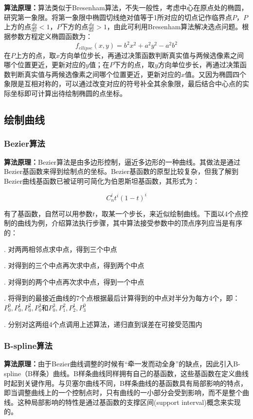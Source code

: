\documentclass[a4paper,UTF8]{article}
\theoremstyle{definition}
\begin{document}
\textbf{算法原理：}算法类似于Bresenham算法，不失一般性，考虑中心在原点处的椭圆，研究第一象限。将第一象限中椭圆切线绝对值等于1所对应的切点记作临界点$P$，$P$上方的点$\frac{dy}{dx}<1$，$P$下方的点$\frac{dy}{dx}>1$，由此可利用Bresenham算法解决选点问题。根据参数方程定义椭圆函数为：
$$f_{ellipse}(x,y)=b^2x^2+a^2y^2-a^2b^2$$
在$P$上方的点，取$x$方向单位步长，再通过决策函数判断真实值与两候选像素之间哪个位置更近，更新对应的$y$值；在$P$下方的点，取$y$方向单位步长，再通过决策函数判断真实值与两候选像素之间哪个位置更近，更新对应的$x$值。又因为椭圆四个象限是互相对称的，可以通过改变对应的符号补全其余象限，最后结合中心点的实际坐标即可计算出待绘制椭圆的点坐标。

\subsection{绘制曲线}

\subsubsection{Bezier算法}

\textbf{算法原理：}Bezier算法是由多边形控制，逼近多边形的一种曲线。其做法是通过Bezier基函数来得到绘制点的坐标。Bezier基函数的原型比较复杂，但我了解到Bezier曲线基函数已被证明可简化为伯恩斯坦基函数，其形式为：

$$C_n^it^i(1-t)^i$$

有了基函数，自然可以用参数$t$，取某一个步长，来近似绘制曲线。下面以4个点控制的曲线为例，介绍算法执行步骤，其中算法接受参数中的顶点序列应当是有序的：

. 对两两相邻点求中点，得到三个中点

. 对得到的三个中点再次求中点，得到两个中点

. 对得到的两个中点再次求中点，得到一个中点

. 将得到的最接近曲线的7个点根据最后计算得到的中点对半分为每方4个，即：$P_0^0,P_0^1,P_0^2,P_0^3$和$P_0^3,P_1^2,P_2^1,P_3^0$ 

. 分别对这两组4个点调用上述算法，递归直到误差在可接受范围内

\subsubsection{B-spline算法}

\textbf{算法原理：}由于Bezier曲线调整的时候有“牵一发而动全身”的缺点，因此引入B-spline（B样条）曲线。B样条曲线同样拥有自己的基函数，这些基函数在定义曲线时起到关键作用。与贝塞尔曲线不同，B样条曲线的基函数具有局部影响的特点，即当调整曲线上的一个控制点时，只有曲线的一小部分会受到影响，而不是整个曲线。这种局部影响的特性是通过基函数的支撑区间(support interval)概念来实现的。
\end{document}
